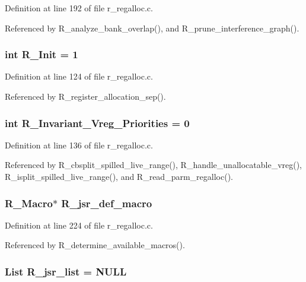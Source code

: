 Definition at line 192 of file r\_\-regalloc.c.

Referenced by R\_\-analyze\_\-bank\_\-overlap(), and R\_\-prune\_\-interference\_\-graph().
\subsubsection{\setlength{\rightskip}{0pt plus 5cm}int \bf{R\_\-Init} = 1}\label{r__regalloc_8c_449a2a9288e72e91e512dc072c8c4ec2}




Definition at line 124 of file r\_\-regalloc.c.

Referenced by R\_\-register\_\-allocation\_\-sep().
\subsubsection{\setlength{\rightskip}{0pt plus 5cm}int \bf{R\_\-Invariant\_\-Vreg\_\-Priorities} = 0}\label{r__regalloc_8c_ed4046d2e70d6083273a5c1cb109c7af}




Definition at line 136 of file r\_\-regalloc.c.

Referenced by R\_\-cbsplit\_\-spilled\_\-live\_\-range(), R\_\-handle\_\-unallocatable\_\-vreg(), R\_\-isplit\_\-spilled\_\-live\_\-range(), and R\_\-read\_\-parm\_\-regalloc().
\subsubsection{\setlength{\rightskip}{0pt plus 5cm}\bf{R\_\-Macro}$\ast$ \bf{R\_\-jsr\_\-def\_\-macro}}\label{r__regalloc_8c_58eacaad61f390154672f7aaaf697d74}




Definition at line 224 of file r\_\-regalloc.c.

Referenced by R\_\-determine\_\-available\_\-macros().
\subsubsection{\setlength{\rightskip}{0pt plus 5cm}\bf{List} \bf{R\_\-jsr\_\-list} = \bf{NULL}}\label{r__regalloc_8c_e42142c3cf3f4b03b9c81ee578366b4a}




